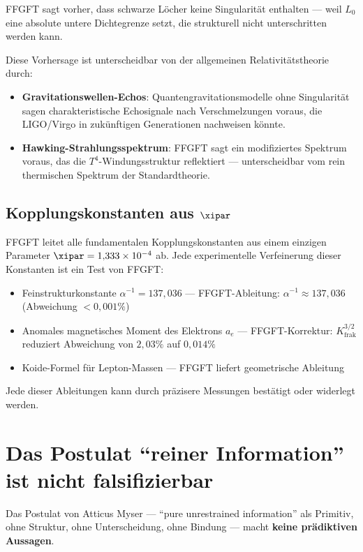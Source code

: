 FFGFT sagt vorher, dass schwarze Löcher keine Singularität enthalten --- weil $L_0$ eine absolute untere Dichtegrenze setzt, die strukturell nicht unterschritten werden kann.

Diese Vorhersage ist unterscheidbar von der allgemeinen Relativitätstheorie durch:
\begin{itemize}
  \item \textbf{Gravitationswellen-Echos}: Quantengravitationsmodelle ohne Singularität sagen charakteristische Echosignale nach Verschmelzungen voraus, die LIGO/Virgo in zukünftigen Generationen nachweisen könnte.
  \item \textbf{Hawking-Strahlungsspektrum}: FFGFT sagt ein modifiziertes Spektrum voraus, das die $T^4$-Windungsstruktur reflektiert --- unterscheidbar vom rein thermischen Spektrum der Standardtheorie.
\end{itemize}

\subsection{Kopplungskonstanten aus $\xipar$}

FFGFT leitet alle fundamentalen Kopplungskonstanten aus einem einzigen Parameter $\xipar = 1{,}333 \times 10^{-4}$ ab. Jede experimentelle Verfeinerung dieser Konstanten ist ein Test von FFGFT:
\begin{itemize}
  \item Feinstrukturkonstante $\alpha^{-1} = 137{,}036$ --- FFGFT-Ableitung: $\alpha^{-1} \approx 137{,}036$ (Abweichung $< 0{,}001\%$)
  \item Anomales magnetisches Moment des Elektrons $a_e$ --- FFGFT-Korrektur: $K_\text{frak}^{3/2}$ reduziert Abweichung von $2{,}03\%$ auf $0{,}014\%$
  \item Koide-Formel für Lepton-Massen --- FFGFT liefert geometrische Ableitung
\end{itemize}
Jede dieser Ableitungen kann durch präzisere Messungen bestätigt oder widerlegt werden.

\section{Das Postulat ``reiner Information'' ist nicht falsifizierbar}

Das Postulat von Atticus Myser --- ``pure unrestrained information'' als Primitiv, ohne Struktur, ohne Unterscheidung, ohne Bindung --- macht \textbf{keine prädiktiven Aussagen}.

